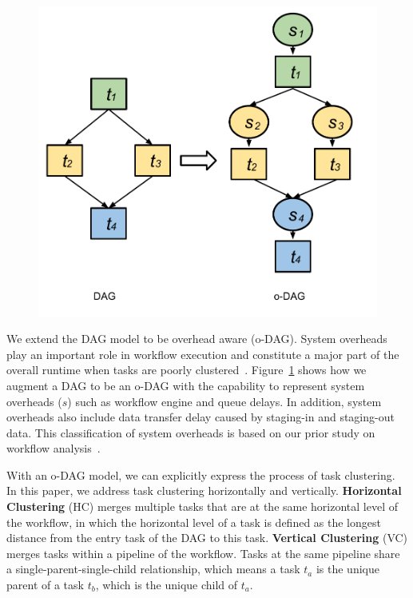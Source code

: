 \documentclass{IOS-Book-Article}
\begin{document}
\begin{figure}[!htb]
	\centering
	\includegraphics[width=0.6\linewidth]{figure2.pdf}
	\label{fig:model_odag}
\end{figure}

We extend the DAG model to be overhead aware (o-DAG). System overheads play an important role in workflow execution and constitute a major part of the overall runtime when tasks are poorly clustered~\cite{Chen2011}. Figure~\ref{fig:model_odag} shows how we augment a DAG to be an o-DAG with the capability to represent system overheads ($s$) such as workflow engine and queue delays. In addition, system overheads also include data transfer delay caused by staging-in and staging-out data. This classification of system overheads is based on our prior study on workflow analysis~\cite{Chen2011}. 

With an o-DAG model, we can explicitly express the process of task clustering. In this paper, we address task clustering horizontally and vertically. \textbf{Horizontal Clustering} (HC) merges multiple tasks that are at the same horizontal level of the workflow, in which the horizontal level of a task is defined as the longest distance from the entry task of the DAG to this task. \textbf{Vertical Clustering} (VC) merges tasks within a pipeline of the workflow. Tasks at the same pipeline share a single-parent-single-child relationship, which means a task $t_a$ is the unique parent of a task $t_b$, which is the unique child of $t_a$. 
\end{document}
